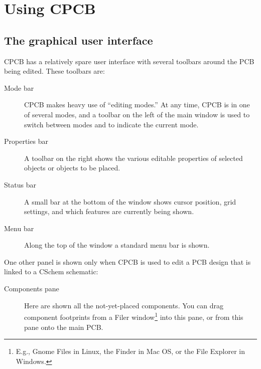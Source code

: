 \documentclass[11pt]{report}
\begin{document}
\chapter{Using CPCB}\label{ch.using}

\section{The graphical user interface}

CPCB has a relatively spare user interface with several toolbars
around the PCB being edited. These toolbars are:
\begin{description}
  \item[Mode bar] CPCB makes heavy use of
``editing modes.'' At any time, CPCB is in one of several modes, and a
toolbar on the left of the main window is used to switch between modes
and to indicate the current mode.
\item[Properties bar]  A toolbar on the right shows the various
  editable properties of
  selected objects or objects to be placed.
\item[Status bar] A small  bar at the bottom of the window shows cursor
  position, grid settings, and which features are currently being shown.
\item[Menu bar]Along the top of the window a standard menu bar is
  shown.
\end{description}
One other panel is shown only  when CPCB is used to edit a PCB design that
is linked to a CSchem schematic:
\begin{description}
  \item[Components pane] Here are shown all the not-yet-placed
    components. You can drag component footprints from a Filer
    window\footnote{E.g., Gnome Files in Linux, the Finder
        in Mac OS, or the File Explorer in Windows.} into this pane,
      or from this pane onto the main PCB.
\end{description}
\end{document}

